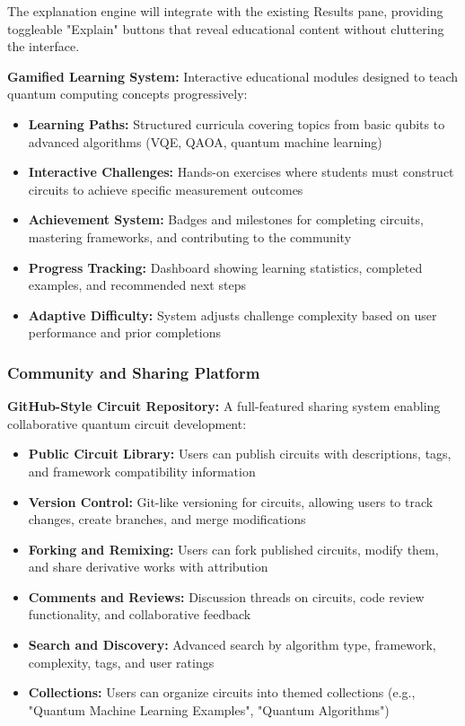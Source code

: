 The explanation engine will integrate with the existing Results pane, providing toggleable "Explain" buttons that reveal educational content without cluttering the interface.

\textbf{Gamified Learning System:} Interactive educational modules designed to teach quantum computing concepts progressively:
\begin{itemize}
    \item \textbf{Learning Paths:} Structured curricula covering topics from basic qubits to advanced algorithms (VQE, QAOA, quantum machine learning)
    \item \textbf{Interactive Challenges:} Hands-on exercises where students must construct circuits to achieve specific measurement outcomes
    \item \textbf{Achievement System:} Badges and milestones for completing circuits, mastering frameworks, and contributing to the community
    \item \textbf{Progress Tracking:} Dashboard showing learning statistics, completed examples, and recommended next steps
    \item \textbf{Adaptive Difficulty:} System adjusts challenge complexity based on user performance and prior completions
\end{itemize}

\subsubsection{Community and Sharing Platform}

\textbf{GitHub-Style Circuit Repository:} A full-featured sharing system enabling collaborative quantum circuit development:
\begin{itemize}
    \item \textbf{Public Circuit Library:} Users can publish circuits with descriptions, tags, and framework compatibility information
    \item \textbf{Version Control:} Git-like versioning for circuits, allowing users to track changes, create branches, and merge modifications
    \item \textbf{Forking and Remixing:} Users can fork published circuits, modify them, and share derivative works with attribution
    \item \textbf{Comments and Reviews:} Discussion threads on circuits, code review functionality, and collaborative feedback
    \item \textbf{Search and Discovery:} Advanced search by algorithm type, framework, complexity, tags, and user ratings
    \item \textbf{Collections:} Users can organize circuits into themed collections (e.g., "Quantum Machine Learning Examples", "Quantum Algorithms")
\end{itemize}

